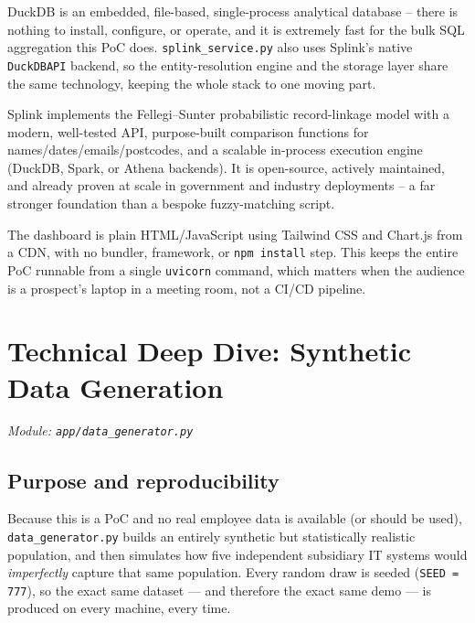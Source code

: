 \documentclass[11pt]{report}
\newcommand{\code}[1]{\lstinline[style=plain]!#1!}
\begin{document}
\begin{description}[style=nextline]
\item[Why DuckDB, not Postgres/MySQL?] DuckDB is an embedded, file-based, single-process analytical database -- there is nothing to install, configure, or operate, and it is extremely fast for the bulk SQL aggregation this PoC does. \texttt{splink\_service.py} also uses Splink's native \texttt{DuckDBAPI} backend, so the entity-resolution engine and the storage layer share the same technology, keeping the whole stack to one moving part.
\item[Why Splink specifically?] Splink implements the Fellegi--Sunter probabilistic record-linkage model with a modern, well-tested API, purpose-built comparison functions for names/dates/emails/postcodes, and a scalable in-process execution engine (DuckDB, Spark, or Athena backends). It is open-source, actively maintained, and already proven at scale in government and industry deployments -- a far stronger foundation than a bespoke fuzzy-matching script.
\item[Why a build-step-free frontend?] The dashboard is plain HTML/JavaScript using Tailwind CSS and Chart.js from a CDN, with no bundler, framework, or \texttt{npm install} step. This keeps the entire PoC runnable from a single \texttt{uvicorn} command, which matters when the audience is a prospect's laptop in a meeting room, not a CI/CD pipeline.
\end{description}

\chapter{Technical Deep Dive: Synthetic Data Generation}
\label{ch:datagen}

\textit{Module: \texttt{app/data\_generator.py}}

\section{Purpose and reproducibility}

Because this is a PoC and no real employee data is available (or should be used), \texttt{data\_generator.py} builds an entirely synthetic but statistically realistic population, and then simulates how five independent subsidiary IT systems would \emph{imperfectly} capture that same population. Every random draw is seeded (\code{SEED = 777}), so the exact same dataset --- and therefore the exact same demo --- is produced on every machine, every time.
\end{document}
